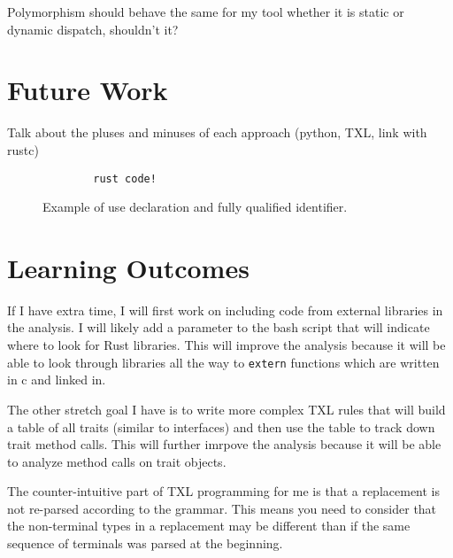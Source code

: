 \documentclass[11pt]{article}
\begin{document}
Polymorphism should behave the same for my tool whether it is static or dynamic dispatch, shouldn't it?

\section{Future Work}

Talk about the pluses and minuses of each approach (python, TXL, link with rustc)


\begin{figure}
    \caption{Example of use declaration and fully qualified identifier.}
    \label{fig:qualifiers}
    \begin{lstlisting}
        rust code!
    \end{lstlisting}
\end{figure}

\section{Learning Outcomes}
If I have extra time, I will first work on including code from external libraries in the analysis.
I will likely add a parameter to the bash script that will indicate where to look for Rust libraries.
This will improve the analysis because it will be able to look through libraries all the way to \lstinline{extern} functions which are written in c and linked in.

The other stretch goal I have is to write more complex TXL rules that will build a table of all traits (similar to interfaces) and then use the table to track down trait method calls.
This will further imrpove the analysis because it will be able to analyze method calls on trait objects.

The counter-intuitive part of TXL programming for me is that a replacement is not re-parsed according to the grammar.
This means you need to consider that the non-terminal types in a replacement may be different than if the same sequence of terminals was parsed at the beginning.
\end{document}
